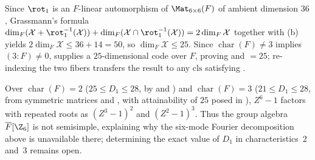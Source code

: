\begin{outline}
Since $\rot_1$ is an $F$-linear automorphism of $\Mat_{6\times 6}(F)$ of ambient dimension $36$,
Grassmann's formula $\dim_F(\mathcal{X} + \rot_1^{-1}(\mathcal{X})) +
\dim_F(\mathcal{X} \cap \rot_1^{-1}(\mathcal{X})) = 2\dim_F \mathcal{X}$ together with
(b) yields $2\dim_F \mathcal{X} \le 36 + 14 = 50$, so
$\dim_F \mathcal{X} \le 25$. Since $\operatorname{char}(F) \ne 3$ implies $(3 : F) \ne 0$,
 supplies a $25$-dimensional code over $F$,
proving  and ${} = 25$; re-indexing the two fibers
transfers the result to any $\mathrm{cls}$ satisfying .
\end{outline}

\begin{remark}\label{rem:aperiodic-six-chars}
Over $\operatorname{char}(F) = 2$ ($25 \le D_1 \le 28$, by
\cite[Theorem~6.4 and Proposition~8.2]{SeventeenthPaper2026} and
\cite[Theorem~3.2]{ClassUniformMemo2026}) and $\operatorname{char}(F) = 3$ ($21 \le D_1 \le 28$, from
symmetric matrices and \cite[Theorem~6.4]{SeventeenthPaper2026}, with attainability of $25$ posed in
\cite[Problem~6.1]{ClassUniformMemo2026}), $Z^6 - 1$ factors with repeated roots as $(Z^3 - 1)^2$ and
$(Z^2 - 1)^3$. Thus the group algebra $\overline{F}[\Z_6]$ is not semisimple, explaining why the
six-mode Fourier decomposition above is unavailable there; determining the exact value of $D_1$ in
characteristics~$2$ and~$3$ remains open.
\end{remark}
